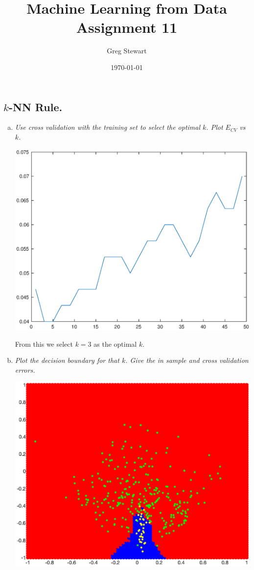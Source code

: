 \documentclass{article}
\title{Machine Learning from Data Assignment 11}
\author{Greg Stewart}
\date{\today}
\begin{document}
\maketitle

\subsection*{$k$-NN Rule.}

\begin{enumerate}[(a)]
  \item \textit{Use cross validation with the training set to select the optimal $k$. Plot 
    $E_{CV}$ vs $k$.}

    \includegraphics[width=\textwidth]{3NNECV1.eps}

    From this we select $k = 3$ as the optimal $k$.

  \item \textit{Plot the decision boundary for that $k$. Give the in sample and cross validation
    errors.}

    \includegraphics[width=\textwidth]{3NNdecision1.eps}


\end{enumerate}
\end{document}
